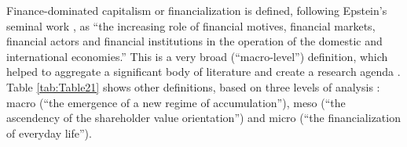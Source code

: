 \documentclass[a4paper, twoside]{templates/ociamthesis}
\begin{document}
Finance-dominated capitalism \autocite{hein2015c} or financialization is defined, following Epstein's seminal work \autocite*[ 3]{epstein2005}, as ``the increasing role of financial motives, financial markets, financial actors and financial institutions in the operation of the domestic and international economies.'' This is a very broad (``macro-level'') definition, which helped to aggregate a significant body of literature and create a research agenda \autocite{mader2020}. Table \ref{tab:Table21} shows other definitions, based on three levels of analysis \autocite{vanderzwan2014}: macro (``the emergence of a new regime of accumulation''), meso (``the ascendency of the shareholder value orientation'') and micro (``the financialization of everyday life'').
\end{document}
